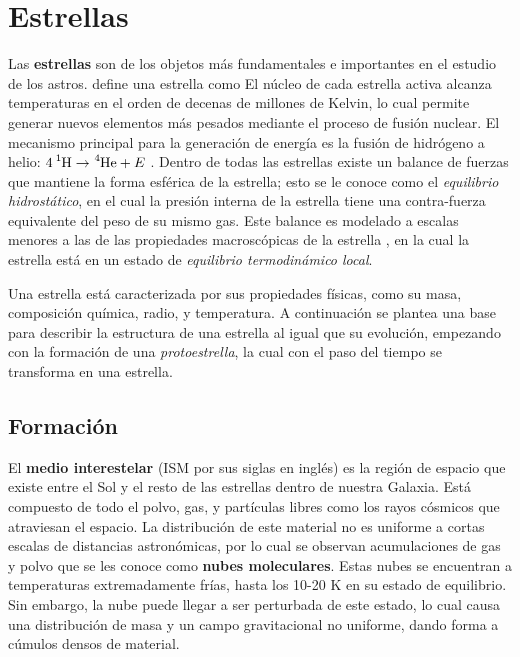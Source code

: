 \chapter{Estrellas}

Las \textbf{estrellas} son de los objetos más fundamentales e importantes en el
estudio de los astros.  define una
estrella como 
El núcleo de cada estrella activa alcanza temperaturas en el orden de decenas de
millones de Kelvin, lo cual permite generar nuevos elementos más pesados mediante el
proceso de fusión nuclear. El mecanismo principal para la generación de energía
es la fusión de hidrógeno a helio: $\ce{4 ^1H} \rightarrow \ce{^4He} + E$ .
Dentro de todas las estrellas existe un balance de fuerzas que mantiene la forma
esférica de la estrella; esto se le conoce como el \textit{equilibrio
hidrostático}, en el cual la presión interna de la estrella tiene una
contra-fuerza equivalente del peso de su mismo gas. Este balance es modelado a
escalas menores a las de las propiedades macroscópicas de la estrella
, en la cual la
estrella está en un estado de \textit{equilibrio termodinámico local}. 

Una estrella está caracterizada por sus propiedades físicas, como su masa,
composición química, radio, y temperatura. A continuación se plantea una base
para describir la estructura de una estrella al igual que su evolución,
empezando con la formación de una \textit{protoestrella}, la cual con el paso del
tiempo se transforma en una estrella.

\section{Formación}

El \textbf{medio interestelar} (ISM por sus siglas en inglés) es la región de
espacio que existe entre el Sol y el resto de las estrellas dentro de nuestra
Galaxia. Está compuesto de todo el polvo, gas, y partículas libres como los
rayos cósmicos que atraviesan el espacio. La distribución de este material no es
uniforme a cortas escalas de distancias astronómicas, por lo cual se observan
acumulaciones de gas y polvo que se les conoce como \textbf{nubes moleculares}.
Estas nubes se encuentran a temperaturas extremadamente frías, hasta los
10-20 K en su estado de equilibrio. Sin embargo, la nube puede llegar a ser
perturbada de este estado, lo cual causa una distribución de masa y un campo
gravitacional no uniforme, dando forma a cúmulos densos de material.

